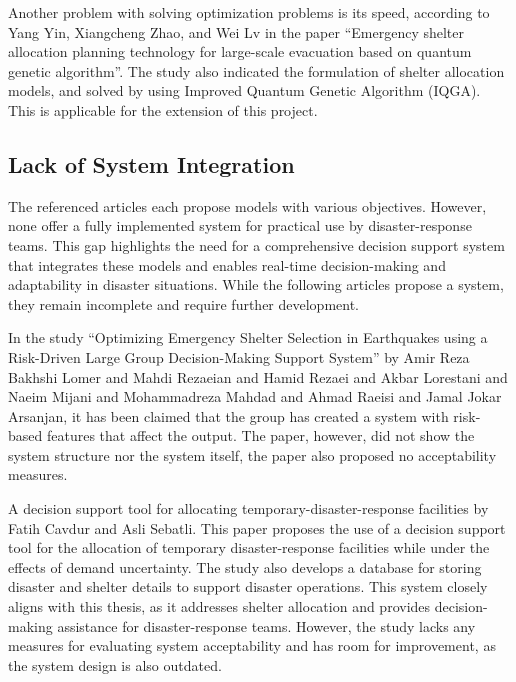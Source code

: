 Another problem with solving optimization problems is its speed, according to Yang Yin, Xiangcheng Zhao, and Wei Lv in the paper “Emergency shelter allocation planning technology for large-scale evacuation based on quantum genetic algorithm”. The study also indicated the formulation of shelter allocation models, and solved by using Improved Quantum Genetic Algorithm (IQGA). This is applicable for the extension of this project. \parencite{Yin2023}

\subsection{Lack of System Integration}

The referenced articles each propose models with various objectives. However, none offer a fully implemented system for practical use by disaster-response teams. This gap highlights the need for a comprehensive decision support system that integrates these models and enables real-time decision-making and adaptability in disaster situations. While the following articles propose a system, they remain incomplete and require further development.

In the study “Optimizing Emergency Shelter Selection in Earthquakes using a Risk-Driven Large Group Decision-Making Support System” by Amir Reza Bakhshi Lomer and Mahdi Rezaeian and Hamid Rezaei and Akbar Lorestani and Naeim Mijani and Mohammadreza Mahdad and Ahmad Raeisi and Jamal Jokar Arsanjan, it has been claimed that the group has created a system with risk-based features that affect the output. The paper, however, did not show the system structure nor the system itself, the paper also proposed no acceptability measures. \parencite{Amir2023}

A decision support tool for allocating temporary-disaster-response facilities by Fatih Cavdur and Asli Sebatli. This paper proposes the use of a decision support tool for the allocation of temporary disaster-response facilities while under the effects of demand uncertainty. The study also develops a database for storing disaster and shelter details to support disaster operations. This system closely aligns with this thesis, as it addresses shelter allocation and provides decision-making assistance for disaster-response teams. However, the study lacks any measures for evaluating system acceptability and has room for improvement, as the system design is also outdated. \parencite{Cavdur2019}

